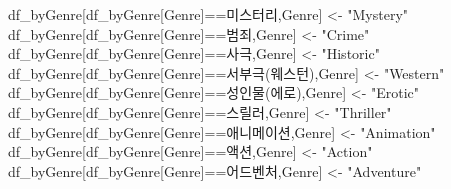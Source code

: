 \documentclass[
]{article}
\newenvironment{Shaded}{\begin{snugshade}}{\end{snugshade}}
\newcommand{\NormalTok}[1]{#1}
\newcommand{\OtherTok}[1]{\textcolor[rgb]{0.56,0.35,0.01}{#1}}
\newcommand{\SpecialCharTok}[1]{\textcolor[rgb]{0.00,0.00,0.00}{#1}}
\newcommand{\StringTok}[1]{\textcolor[rgb]{0.31,0.60,0.02}{#1}}
\begin{document}
\begin{Shaded}
\begin{Highlighting}[]
\NormalTok{df\_byGenre[df\_byGenre[}\StringTok{\textquotesingle{}Genre\textquotesingle{}}\NormalTok{]}\SpecialCharTok{==}\StringTok{\textquotesingle{}미스터리\textquotesingle{}}\NormalTok{,}\StringTok{\textquotesingle{}Genre\textquotesingle{}}\NormalTok{] }\OtherTok{\textless{}{-}} \StringTok{"Mystery"}
\NormalTok{df\_byGenre[df\_byGenre[}\StringTok{\textquotesingle{}Genre\textquotesingle{}}\NormalTok{]}\SpecialCharTok{==}\StringTok{\textquotesingle{}범죄\textquotesingle{}}\NormalTok{,}\StringTok{\textquotesingle{}Genre\textquotesingle{}}\NormalTok{] }\OtherTok{\textless{}{-}} \StringTok{"Crime"}
\NormalTok{df\_byGenre[df\_byGenre[}\StringTok{\textquotesingle{}Genre\textquotesingle{}}\NormalTok{]}\SpecialCharTok{==}\StringTok{\textquotesingle{}사극\textquotesingle{}}\NormalTok{,}\StringTok{\textquotesingle{}Genre\textquotesingle{}}\NormalTok{] }\OtherTok{\textless{}{-}} \StringTok{"Historic"}
\NormalTok{df\_byGenre[df\_byGenre[}\StringTok{\textquotesingle{}Genre\textquotesingle{}}\NormalTok{]}\SpecialCharTok{==}\StringTok{\textquotesingle{}서부극(웨스턴)\textquotesingle{}}\NormalTok{,}\StringTok{\textquotesingle{}Genre\textquotesingle{}}\NormalTok{] }\OtherTok{\textless{}{-}} \StringTok{"Western"}
\NormalTok{df\_byGenre[df\_byGenre[}\StringTok{\textquotesingle{}Genre\textquotesingle{}}\NormalTok{]}\SpecialCharTok{==}\StringTok{\textquotesingle{}성인물(에로)\textquotesingle{}}\NormalTok{,}\StringTok{\textquotesingle{}Genre\textquotesingle{}}\NormalTok{] }\OtherTok{\textless{}{-}} \StringTok{"Erotic"}
\NormalTok{df\_byGenre[df\_byGenre[}\StringTok{\textquotesingle{}Genre\textquotesingle{}}\NormalTok{]}\SpecialCharTok{==}\StringTok{\textquotesingle{}스릴러\textquotesingle{}}\NormalTok{,}\StringTok{\textquotesingle{}Genre\textquotesingle{}}\NormalTok{] }\OtherTok{\textless{}{-}} \StringTok{"Thriller"}
\NormalTok{df\_byGenre[df\_byGenre[}\StringTok{\textquotesingle{}Genre\textquotesingle{}}\NormalTok{]}\SpecialCharTok{==}\StringTok{\textquotesingle{}애니메이션\textquotesingle{}}\NormalTok{,}\StringTok{\textquotesingle{}Genre\textquotesingle{}}\NormalTok{] }\OtherTok{\textless{}{-}} \StringTok{"Animation"}
\NormalTok{df\_byGenre[df\_byGenre[}\StringTok{\textquotesingle{}Genre\textquotesingle{}}\NormalTok{]}\SpecialCharTok{==}\StringTok{\textquotesingle{}액션\textquotesingle{}}\NormalTok{,}\StringTok{\textquotesingle{}Genre\textquotesingle{}}\NormalTok{] }\OtherTok{\textless{}{-}} \StringTok{"Action"}
\NormalTok{df\_byGenre[df\_byGenre[}\StringTok{\textquotesingle{}Genre\textquotesingle{}}\NormalTok{]}\SpecialCharTok{==}\StringTok{\textquotesingle{}어드벤처\textquotesingle{}}\NormalTok{,}\StringTok{\textquotesingle{}Genre\textquotesingle{}}\NormalTok{] }\OtherTok{\textless{}{-}} \StringTok{"Adventure"}

\end{Highlighting}
\end{Shaded}
\end{document}
